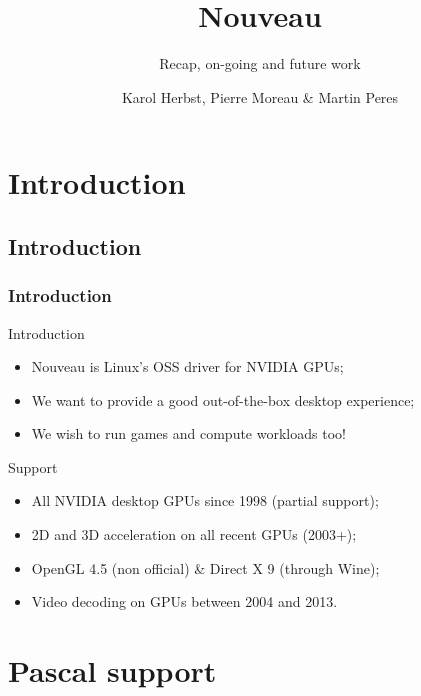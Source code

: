 \documentclass[11pt,english,compress]{beamer}
\title{Nouveau}
\subtitle{Recap, on-going and future work}
\author{Karol Herbst, Pierre Moreau \& Martin Peres}
\institute{Nouveau developers}
\begin{document}

\begin{frame}
	\titlepage
\end{frame}

\section{Introduction}
\subsection*{Introduction}
\begin{frame}
	\frametitle{Introduction}

	\begin{block}{Introduction}
		\begin{itemize}
			\item Nouveau is Linux's OSS driver for NVIDIA GPUs;
			\item We want to provide a good out-of-the-box desktop experience;
			\item We wish to run games and compute workloads too!
		\end{itemize}
	\end{block}

	\pause

	\begin{block}{Support}
		\begin{itemize}
			\item All NVIDIA desktop GPUs since 1998 (partial support);
			\item 2D and 3D acceleration on all recent GPUs (2003+);
			\item OpenGL 4.5 (non official) \& Direct X 9 (through Wine);
			\item Video decoding on GPUs between 2004 and 2013.
		\end{itemize}
	\end{block}
\end{frame}

\section{Pascal support}
\end{document}
